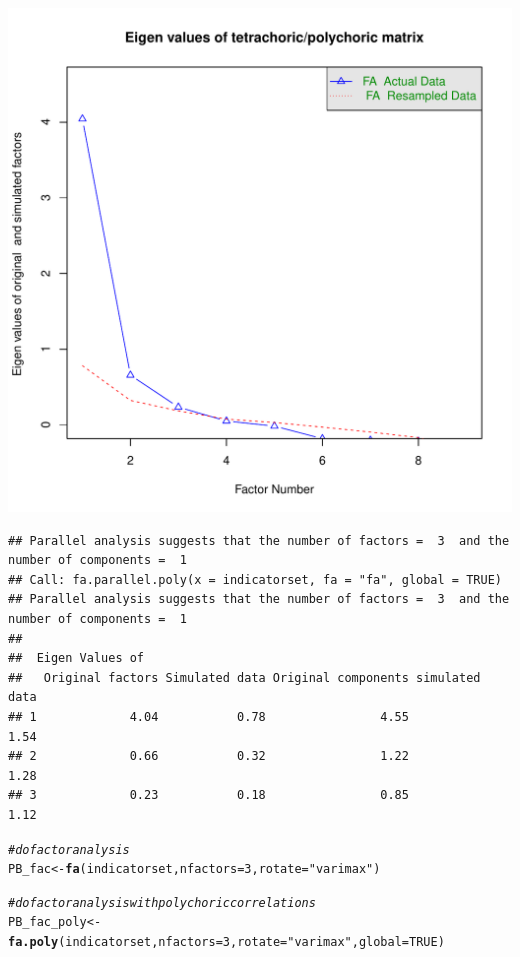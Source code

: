 \documentclass{article}\usepackage[]{graphicx}\usepackage[]{color}
\makeatletter
\def\maxwidth{ %
  \ifdim\Gin@nat@width>\linewidth
    \linewidth
  \else
    \Gin@nat@width
  \fi
}
\newcommand{\hlnum}[1]{\textcolor[rgb]{0.686,0.059,0.569}{#1}}%
\newcommand{\hlstr}[1]{\textcolor[rgb]{0.192,0.494,0.8}{#1}}%
\newcommand{\hlcom}[1]{\textcolor[rgb]{0.678,0.584,0.686}{\textit{#1}}}%
\newcommand{\hlstd}[1]{\textcolor[rgb]{0.345,0.345,0.345}{#1}}%
\newcommand{\hlkwb}[1]{\textcolor[rgb]{0.69,0.353,0.396}{#1}}%
\newcommand{\hlkwc}[1]{\textcolor[rgb]{0.333,0.667,0.333}{#1}}%
\newcommand{\hlkwd}[1]{\textcolor[rgb]{0.737,0.353,0.396}{\textbf{#1}}}%
\newenvironment{kframe}{%
 \def\at@end@of@kframe{}%
 \ifinner\ifhmode%
  \def\at@end@of@kframe{\end{minipage}}%
  \begin{minipage}{\columnwidth}%
 \fi\fi%
 \def\FrameCommand##1{\hskip\@totalleftmargin \hskip-\fboxsep
 \colorbox{shadecolor}{##1}\hskip-\fboxsep
     \hskip-\linewidth \hskip-\@totalleftmargin \hskip\columnwidth}%
 \MakeFramed {\advance\hsize-\width
   \@totalleftmargin\z@ \linewidth\hsize
   \@setminipage}}%
 {\par\unskip\endMakeFramed%
 \at@end@of@kframe}
\newenvironment{knitrout}{}{} %
\makeatother
\begin{document}
\begin{knitrout}
\includegraphics[width=\maxwidth]{figure/psych2} 
\begin{kframe}\begin{verbatim}
## Parallel analysis suggests that the number of factors =  3  and the number of components =  1
## Call: fa.parallel.poly(x = indicatorset, fa = "fa", global = TRUE)
## Parallel analysis suggests that the number of factors =  3  and the number of components =  1 
## 
##  Eigen Values of 
##   Original factors Simulated data Original components simulated data
## 1             4.04           0.78                4.55           1.54
## 2             0.66           0.32                1.22           1.28
## 3             0.23           0.18                0.85           1.12
\end{verbatim}
\begin{alltt}
\hlcom{#do factor analysis}
\hlstd{PB_fac} \hlkwb{<-} \hlkwd{fa}\hlstd{(indicatorset,} \hlkwc{nfactors}\hlstd{=}\hlnum{3}\hlstd{,} \hlkwc{rotate}\hlstd{=}\hlstr{"varimax"}\hlstd{)}

\hlcom{#do factor analysis with polychoric correlations}
\hlstd{PB_fac_poly} \hlkwb{<-} \hlkwd{fa.poly}\hlstd{(indicatorset,} \hlkwc{nfactors}\hlstd{=}\hlnum{3}\hlstd{,} \hlkwc{rotate}\hlstd{=}\hlstr{"varimax"}\hlstd{,}\hlkwc{global}\hlstd{=}\hlnum{TRUE}\hlstd{)}


\end{alltt}
\end{kframe}
\end{knitrout}
\end{document}
